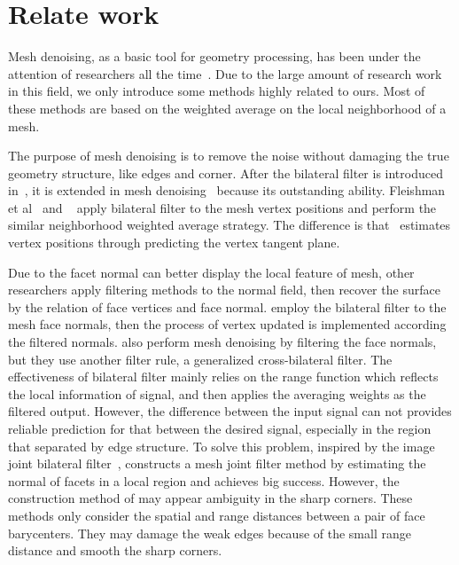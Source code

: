 \section{Relate work}

Mesh denoising, as a basic tool for geometry processing, has been under the attention of researchers all the time~\cite{Wang2008comprehensive}.
Due to the large amount of research work in this field, we only introduce some methods highly related to ours. 
Most of these methods are based on the weighted average on the local neighborhood of a mesh.

The purpose of mesh denoising is to remove the noise without damaging the true geometry structure, like edges and corner.
After the bilateral filter is introduced in~\cite{tomasi1998bilateral}, 
it is extended in mesh denoising~\cite{fleishman2003bilateral, jones2003non, zheng2011bilateral, Solomon2014general} because its outstanding ability.
Fleishman et al~\cite{fleishman2003bilateral} and ~\cite{jones2003non} apply bilateral filter to the mesh vertex positions and perform the similar neighborhood weighted average strategy.
The difference is that~\cite{jones2003non} estimates vertex positions through predicting the vertex tangent plane.

Due to the facet normal can better display the local feature of mesh, other researchers apply filtering methods to the normal field, 
then recover the surface by the relation of face vertices and face normal.
\cite{zheng2011bilateral} employ the bilateral filter to the mesh face normals, then the process of vertex updated is implemented according the filtered normals.
\cite{Solomon2014general} also perform mesh denoising by filtering the face normals, but they use another filter rule, a generalized cross-bilateral filter.
The effectiveness of bilateral filter mainly relies on the range function which reflects the local information of signal, and then applies the averaging weights as the filtered output.
However, the difference between the input signal can not provides reliable prediction for that between the desired signal, especially in the region that separated by edge structure.
To solve this problem, inspired by the image joint bilateral filter~\cite{eisemann2004flash, Petschnigg2004}, 
\cite{Zhang2015Filter} constructs a mesh joint filter method by estimating the normal of facets in a local region and achieves big success.
However, the construction method of \cite{Zhang2015Filter} may appear ambiguity in the sharp corners.
These methods \cite{zheng2011bilateral, Solomon2014general, Zhang2015Filter} only consider the spatial and range distances between a pair of face barycenters.
They may damage the weak edges because of the small range distance and smooth the sharp corners.

